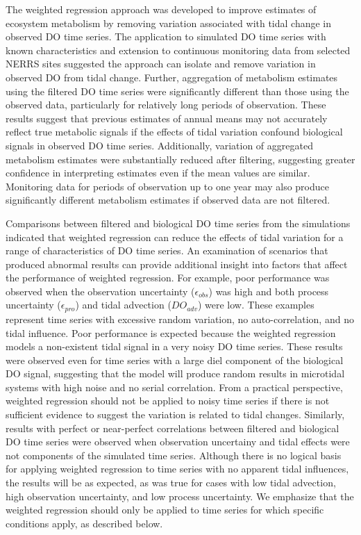 \documentclass[letterpaper,12pt,oneside]{article}\usepackage[]{graphicx}\usepackage[]{color}
\begin{document}
The weighted regression approach was developed to improve estimates of ecosystem metabolism by removing variation associated with tidal change in observed \ac{DO} time series.  The application to simulated \ac{DO} time series with known characteristics and extension to continuous monitoring data from selected \ac{NERRS} sites suggested the approach can isolate and remove variation in observed \ac{DO} from tidal change.  Further, aggregation of metabolism estimates using the filtered \ac{DO} time series were significantly different than those using the observed data, particularly for relatively long periods of observation. These results suggest that previous estimates of annual means may not accurately reflect true metabolic signals if the effects of tidal variation confound biological signals in observed \ac{DO} time series.  Additionally, variation of aggregated metabolism estimates were substantially reduced after filtering, suggesting greater confidence in interpreting estimates even if the mean values are similar.  Monitoring data for periods of observation up to one year may also produce significantly different metabolism estimates if observed data are not filtered. 

Comparisons between filtered and biological \ac{DO} time series from the simulations indicated that weighted regression can reduce the effects of tidal variation for a range of characteristics of \ac{DO} time series.  An examination of scenarios that produced abnormal results can provide additional insight into factors that affect the performance of weighted regression.  For example, poor performance was observed when the observation uncertainty ($\epsilon_{obs}$) was high and both process uncertainty ($\epsilon_{pro}$) and tidal advection ($DO_{adv}$) were low.  These examples represent time series with excessive random variation, no auto-correlation, and no tidal influence.  Poor performance is expected because the weighted regression models a non-existent tidal signal in a very noisy \ac{DO} time series.  These results were observed even for time series with a large diel component of the biological \ac{DO} signal, suggesting that the model will produce random results in microtidal systems with high noise and no serial correlation.  From a practical perspective, weighted regression should not be applied to noisy time series if there is not sufficient evidence to suggest the variation is related to tidal changes.  Similarly, results with perfect or near-perfect correlations between filtered and biological \ac{DO} time series were observed when observation uncertainy and tidal effects were not components of the simulated time series.  Although there is no logical basis for applying weighted regression to time series with no apparent tidal influences, the results will be as expected, as was true for cases with low tidal advection, high observation uncertainty, and low process uncertainty.  We emphasize that the weighted regression should only be applied to time series for which specific conditions apply, as described below.  
\end{document}
